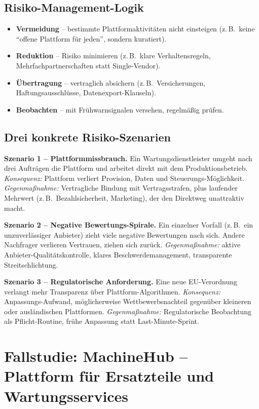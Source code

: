 \documentclass[11pt,a4paper,oneside]{article}
\newcommand{\fachbegriff}[1]{\textbf{#1}}
\begin{document}
\subsection{Risiko-Management-Logik}

\begin{itemize}
  \item \fachbegriff{Vermeidung} -- bestimmte Plattformaktivitäten nicht einsteigen (z.\,B.\ keine ``offene Plattform für jeden'', sondern kuratiert).
  \item \fachbegriff{Reduktion} -- Risiko minimieren (z.\,B.\ klare Verhaltensregeln, Mehrfachpartnerschaften statt Single-Vendor).
  \item \fachbegriff{Übertragung} -- vertraglich absichern (z.\,B.\ Versicherungen, Haftungsausschlüsse, Datenexport-Klauseln).
  \item \fachbegriff{Beobachten} -- mit Frühwarnsignalen versehen, regelmäßig prüfen.
\end{itemize}

\subsection{Drei konkrete Risiko-Szenarien}

\textbf{Szenario 1 -- Plattformmissbrauch.} Ein Wartungsdienstleister umgeht nach drei Aufträgen die Plattform und arbeitet direkt mit dem Produktionsbetrieb. \emph{Konsequenz:} Plattform verliert Provision, Daten und Steuerungs-Möglichkeit. \emph{Gegenmaßnahme:} Vertragliche Bindung mit Vertragsstrafen, plus laufender Mehrwert (z.\,B.\ Bezahlsicherheit, Marketing), der den Direktweg unattraktiv macht.

\textbf{Szenario 2 -- Negative Bewertungs-Spirale.} Ein einzelner Vorfall (z.\,B.\ ein unzuverlässiger Anbieter) zieht viele negative Bewertungen nach sich. Andere Nachfrager verlieren Vertrauen, ziehen sich zurück. \emph{Gegenmaßnahme:} aktive Anbieter-Qualitätskontrolle, klares Beschwerdemanagement, transparente Streitschlichtung.

\textbf{Szenario 3 -- Regulatorische Anforderung.} Eine neue EU-Verordnung verlangt mehr Transparenz über Plattform-Algorithmen. \emph{Konsequenz:} Anpassungs-Aufwand, möglicherweise Wettbewerbsnachteil gegenüber kleineren oder ausländischen Plattformen. \emph{Gegenmaßnahme:} Regulatorische Beobachtung als Pflicht-Routine, frühe Anpassung statt Last-Minute-Sprint.

\section{Fallstudie: MachineHub -- Plattform für Ersatzteile und Wartungsservices}
\end{document}
